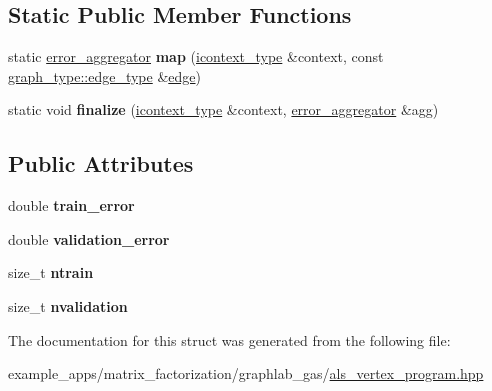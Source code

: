\subsection*{Static Public Member Functions}
\begin{DoxyCompactItemize}
\item 
\hypertarget{structerror__aggregator_a76f377914f60ca35ea5f4f4fac652ec5}{static \hyperlink{structerror__aggregator}{error\-\_\-aggregator} {\bfseries map} (\hyperlink{classgraphlab_1_1icontext}{icontext\-\_\-type} \&context, const \hyperlink{structgraphlab_1_1_graph_lab_edge_wrapper}{graph\-\_\-type\-::edge\-\_\-type} \&\hyperlink{structedge}{edge})}\label{structerror__aggregator_a76f377914f60ca35ea5f4f4fac652ec5}

\item 
\hypertarget{structerror__aggregator_a4caf40a82d825e5335fdcc15928ec2c3}{static void {\bfseries finalize} (\hyperlink{classgraphlab_1_1icontext}{icontext\-\_\-type} \&context, \hyperlink{structerror__aggregator}{error\-\_\-aggregator} \&agg)}\label{structerror__aggregator_a4caf40a82d825e5335fdcc15928ec2c3}

\end{DoxyCompactItemize}
\subsection*{Public Attributes}
\begin{DoxyCompactItemize}
\item 
\hypertarget{structerror__aggregator_a2821929919717d750072da409c516013}{double {\bfseries train\-\_\-error}}\label{structerror__aggregator_a2821929919717d750072da409c516013}

\item 
\hypertarget{structerror__aggregator_ada0b548d6b16f864690a275248c8c19d}{double {\bfseries validation\-\_\-error}}\label{structerror__aggregator_ada0b548d6b16f864690a275248c8c19d}

\item 
\hypertarget{structerror__aggregator_adef80f4bb3516f5c781d108b463d4a98}{size\-\_\-t {\bfseries ntrain}}\label{structerror__aggregator_adef80f4bb3516f5c781d108b463d4a98}

\item 
\hypertarget{structerror__aggregator_a6fec3a73d150498666b65c168d5c3c4e}{size\-\_\-t {\bfseries nvalidation}}\label{structerror__aggregator_a6fec3a73d150498666b65c168d5c3c4e}

\end{DoxyCompactItemize}


The documentation for this struct was generated from the following file\-:\begin{DoxyCompactItemize}
\item 
example\-\_\-apps/matrix\-\_\-factorization/graphlab\-\_\-gas/\hyperlink{als__vertex__program_8hpp}{als\-\_\-vertex\-\_\-program.\-hpp}\end{DoxyCompactItemize}
